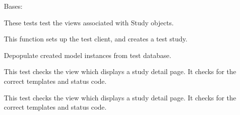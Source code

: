 \documentclass[letterpaper,10pt,english]{sphinxmanual}
\begin{document}

\begin{fulllineitems}
\label{api:data.tests.StudyViewTests}
Bases: 

These tests test the views associated with Study objects.


\begin{fulllineitems}
\label{api:data.tests.StudyViewTests.setUp}
This function sets up the test client, and creates a test study.

\end{fulllineitems}



\begin{fulllineitems}
\label{api:data.tests.StudyViewTests.tearDown}
Depopulate created model instances from test database.

\end{fulllineitems}



\begin{fulllineitems}
\label{api:data.tests.StudyViewTests.test_study_delete}
This test checks the view which displays a study detail page.  It checks for the correct templates and status code.

\end{fulllineitems}



\begin{fulllineitems}
\label{api:data.tests.StudyViewTests.test_study_detail}
This test checks the view which displays a study detail page.  It checks for the correct templates and status code.

\end{fulllineitems}




\end{fulllineitems}
\end{document}
